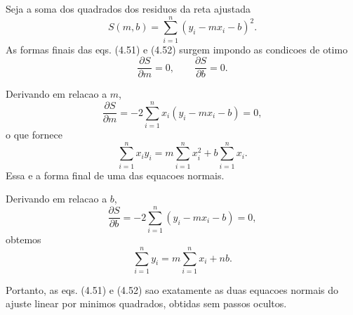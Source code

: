 Seja a soma dos quadrados dos residuos da reta ajustada
\[
S(m,b)=\sum_{i=1}^{n}(y_i-mx_i-b)^2.
\]
As formas finais das eqs. (4.51) e (4.52) surgem impondo as condicoes de otimo
\[
\frac{\partial S}{\partial m}=0,
\qquad
\frac{\partial S}{\partial b}=0.
\]

Derivando em relacao a $m$,
\[
\frac{\partial S}{\partial m}=-2\sum_{i=1}^{n}x_i(y_i-mx_i-b)=0,
\]
o que fornece
\[
\sum_{i=1}^{n}x_i y_i=m\sum_{i=1}^{n}x_i^2+b\sum_{i=1}^{n}x_i.
\]
Essa e a forma final de uma das equacoes normais.

Derivando em relacao a $b$,
\[
\frac{\partial S}{\partial b}=-2\sum_{i=1}^{n}(y_i-mx_i-b)=0,
\]
obtemos
\[
\sum_{i=1}^{n}y_i=m\sum_{i=1}^{n}x_i+nb.
\]

Portanto, as eqs. (4.51) e (4.52) sao exatamente as duas equacoes normais do ajuste linear por minimos quadrados, obtidas sem passos ocultos.